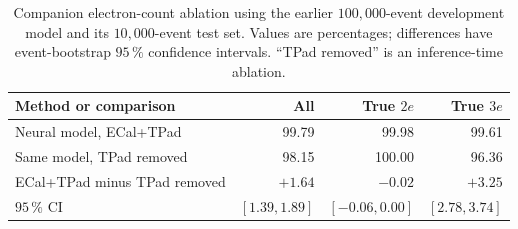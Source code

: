 \begin{table}[htbp]
    \centering
    \small
    \setlength{\tabcolsep}{5pt}
    \caption{Companion electron-count ablation using the earlier
    \(100{,}000\)-event development model and its \(10{,}000\)-event test set.
    Values are percentages; differences have event-bootstrap \(95\,\%\)
    confidence intervals. ``TPad removed'' is an inference-time ablation.}
    \label{tab:results_tpad_count}
    \begin{tabular}{lrrr}
        \hline
        Method or comparison & All & True \(2e\) & True \(3e\) \\
        \hline
        Neural model, ECal+TPad & 99.79 & 99.98 & 99.61 \\
        Same model, TPad removed & 98.15 & 100.00 & 96.36 \\
        \hline
        ECal+TPad minus TPad removed & \(+1.64\) & \(-0.02\) & \(+3.25\) \\
        \(95\,\%\) CI & \([1.39,1.89]\) & \([-0.06,0.00]\) & \([2.78,3.74]\) \\
        \hline
    \end{tabular}
\end{table}
